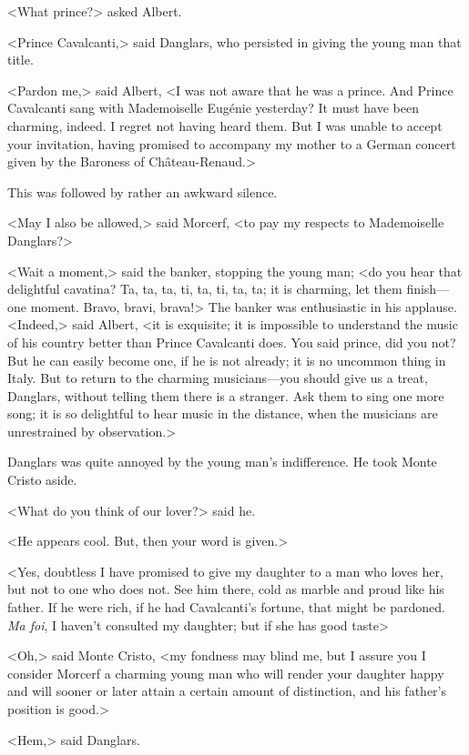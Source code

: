  <What prince?> asked Albert. 

 <Prince Cavalcanti,> said Danglars, who persisted in giving the young man that title. 

 <Pardon me,> said Albert, <I was not aware that he was a prince. And Prince Cavalcanti sang with Mademoiselle Eugénie yesterday? It must have been charming, indeed. I regret not having heard them. But I was unable to accept your invitation, having promised to accompany my mother to a German concert given by the Baroness of Château-Renaud.> 

 This was followed by rather an awkward silence. 

 <May I also be allowed,> said Morcerf, <to pay my respects to Mademoiselle Danglars?> 

 <Wait a moment,> said the banker, stopping the young man; <do you hear that delightful cavatina? Ta, ta, ta, ti, ta, ti, ta, ta; it is charming, let them finish—one moment. Bravo, bravi, brava!> The banker was enthusiastic in his applause.  <Indeed,> said Albert, <it is exquisite; it is impossible to understand the music of his country better than Prince Cavalcanti does. You said prince, did you not? But he can easily become one, if he is not already; it is no uncommon thing in Italy. But to return to the charming musicians—you should give us a treat, Danglars, without telling them there is a stranger. Ask them to sing one more song; it is so delightful to hear music in the distance, when the musicians are unrestrained by observation.> 

 Danglars was quite annoyed by the young man's indifference. He took Monte Cristo aside. 

 <What do you think of our lover?> said he. 

 <He appears cool. But, then your word is given.> 

 <Yes, doubtless I have promised to give my daughter to a man who loves her, but not to one who does not. See him there, cold as marble and proud like his father. If he were rich, if he had Cavalcanti's fortune, that might be pardoned. \textit{Ma foi}, I haven't consulted my daughter; but if she has good taste\longdash> 

 <Oh,> said Monte Cristo, <my fondness may blind me, but I assure you I consider Morcerf a charming young man who will render your daughter happy and will sooner or later attain a certain amount of distinction, and his father's position is good.> 

 <Hem,> said Danglars. 

